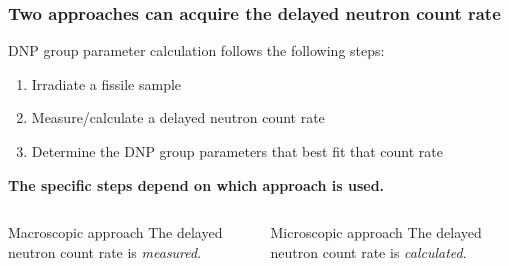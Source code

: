 \begin{frame}
  \frametitle{Two approaches can acquire the delayed neutron count rate}
    \begin{block}{\gls{DNP} group parameter calculation follows the following steps:}
        \begin{enumerate}
            \item Irradiate a fissile sample
            \item Measure/calculate a delayed neutron count rate
            \item Determine the \gls{DNP} group parameters that best fit that count rate
        \end{enumerate}

    \vspace{2mm}
    \textbf{The specific steps depend on which approach is used.}

    \end{block}
        \begin{columns}
                \begin{block}{Macroscopic approach}
                    The delayed neutron count rate is \textit{measured}.
                \end{block}
                \begin{block}{Microscopic approach}
                    The delayed neutron count rate is \textit{calculated}.
                \end{block}
        \end{columns}

\end{frame}
